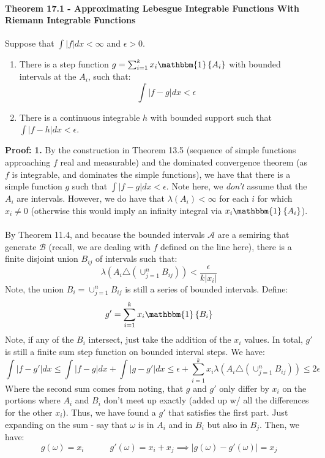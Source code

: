 \documentclass[12pt,a4paper]{article}
\newcommand{\1}[1]{\mathbbm{1}\left\{ #1 \right\}}
\newcommand{\acal}{\mathcal{A}}
\newcommand{\bcal}{\mathcal{B}}
\begin{document}
\paragraph{Theorem 17.1 - Approximating Lebesgue Integrable Functions With Riemann Integrable Functions} Suppose that $\int|f|dx < \infty$ and $\epsilon > 0$.
\begin{enumerate}
	\item There is a step function $g = \sum_{i=1}^k x_i\1{A_i}$ with bounded intervals at the $A_i$, such that:
	$$
		\int |f - g| dx < \epsilon
	$$
	
	\item There is a continuous integrable $h$ with bounded support such that $\int|f - h| dx < \epsilon$.
\end{enumerate}
\textbf{Proof:} \textbf{1.} By the construction in Theorem 13.5 (sequence of simple functions approaching $f$ real and measurable) and the dominated convergence theorem (as $f$ is integrable, and dominates the simple functions), we have that there is a simple function $g$ such that $\int |f - g| dx < \epsilon$. Note here, we \textit{don't} assume that the $A_i$ are intervals. However, we do have that $\lambda(A_i) < \infty$ for each $i$ for which $x_i \neq 0$ (otherwise this would imply an infinity integral via $x_i\1{A_i}$).
\\\\
By Theorem 11.4, and because the bounded intervals $\acal$ are a semiring that generate $\bcal$ (recall, we are dealing with $f$ defined on the line here), there is a finite disjoint union $B_{ij}$ of intervals such that:
$$
	\lambda(A_i \triangle (\cup_{j=1}^n B_{ij})) < \frac{\epsilon}{k|x_i|}
$$
Note, the union $B_i = \cup_{j=1}^n B_{ij}$ is still a series of bounded intervals. Define:
$$
	g' = \sum_{i=1}^k x_i\1{B_i}
$$
Note, if any of the $B_i$ intersect, just take the addition of the $x_i$ values. In total, $g'$ is still a finite sum step function on bounded interval steps. We have:
$$
	\int |f - g'| dx \leq \int |f - g| dx + \int |g - g'| dx \leq \epsilon +
	\sum_{i=1}^k x_i\lambda(A_i \triangle (\cup_{j=1}^n B_{ij})) \leq 2\epsilon
$$
Where the second sum comes from noting, that $g$ and $g'$ only differ by $x_i$ on the portions where $A_i$ and $B_i$ don't meet up exactly (added up w/ all the differences for the other $x_i$). Thus, we have found a $g'$ that satisfies the first part. Just expanding on the sum - say that $\omega$ is in $A_i$ and in $B_i$ but also in $B_j$. Then, we have:
$$
	g(\omega) = x_i \quad\quad\quad
	g'(\omega) = x_i + x_j \implies |g(\omega) - g'(\omega)| = x_j
$$
\end{document}
